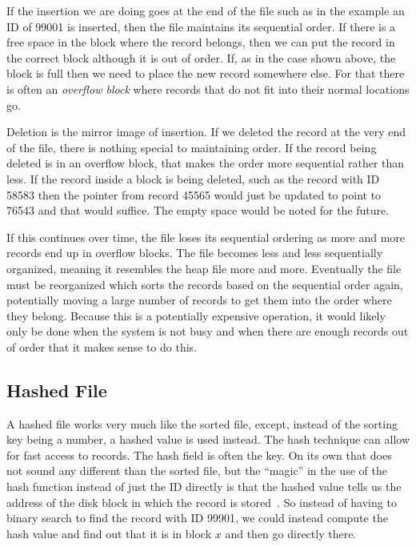If the insertion we are doing goes at the end of the file such as in the example an ID of 99001 is inserted, then the file maintains its sequential order. If there is a free space in the block where the record belongs, then we can put the record in the correct block although it is out of order. If, as in the case shown above, the block is full then we need to place the new record somewhere else. For that there is often an \textit{overflow block} where records that do not fit into their normal locations go. 

Deletion is the mirror image of insertion. If we deleted the record at the very end of the file, there is nothing special to maintaining order. If the record being deleted is in an overflow block, that makes the order more sequential rather than less. If the record inside a block is being deleted, such as the record with ID 58583 then the pointer from record 45565 would just be updated to point to 76543 and that would suffice. The empty space would be noted for the future. 

If this continues over time, the file loses its sequential ordering as more and more records end up in overflow blocks. The file becomes less and less sequentially organized, meaning it resembles the heap file more and more. Eventually the file must be reorganized which sorts the records based on the sequential order again, potentially moving a large number of records to get them into the order where they belong. Because this is a potentially expensive operation, it would likely only be done when the system is not busy and when there are enough records out of order that it makes sense to do this. 

\subsection*{Hashed File}

A hashed file works very much like the sorted file, except, instead of the sorting key being a number, a hashed value is used instead. The hash technique can allow for fast access to records. The hash field is often the key. On its own that does not sound any different than the sorted file, but the ``magic'' in the use of the hash function instead of just the ID directly is that the hashed value tells us the address of the disk block in which the record is stored~\cite{fds}. So instead of having to binary search to find the record with ID 99901, we could instead compute the hash value and find out that it is in block $x$ and then go directly there.

